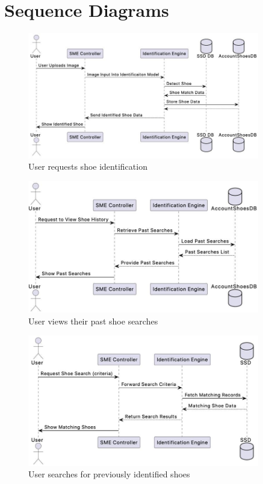 \documentclass[]{article}
\begin{document}

\section{Sequence Diagrams}
\label{sec:sequence_diagrams}

\begin{figure}[H]
    \centering
    \includegraphics[width=0.9\textwidth]{S3/image.jpeg}
    \caption{User requests shoe identification}
\end{figure}

\begin{figure}[H]
    \centering
    \includegraphics[width=0.9\textwidth]{S3/image (1).jpeg}
	\caption{User views their past shoe searches}
\end{figure}

\begin{figure}[H]
    \centering
    \includegraphics[width=0.9\textwidth]{S3/image (2).jpeg}
	\caption{User searches for previously identified shoes}
\end{figure}
\end{document}
